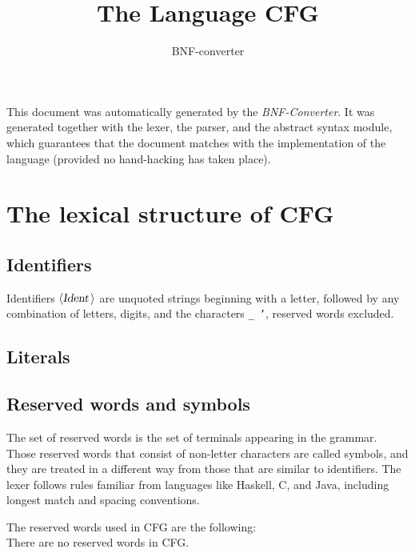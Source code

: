 \documentclass[a4paper,11pt]{article}
\author{BNF-converter}
\title{The Language CFG}
\begin{document}
\maketitle

\newcommand{\emptyP}{\mbox{$\epsilon$}}
\newcommand{\terminal}[1]{\mbox{{\texttt {#1}}}}
\newcommand{\nonterminal}[1]{\mbox{$\langle \mbox{{\sl #1 }} \! \rangle$}}
\newcommand{\arrow}{\mbox{::=}}
\newcommand{\delimit}{\mbox{$|$}}
\newcommand{\reserved}[1]{\mbox{{\texttt {#1}}}}
\newcommand{\literal}[1]{\mbox{{\texttt {#1}}}}
\newcommand{\symb}[1]{\mbox{{\texttt {#1}}}}

This document was automatically generated by the {\em BNF-Converter}. It was generated together with the lexer, the parser, and the abstract syntax module, which guarantees that the document matches with the implementation of the language (provided no hand-hacking has taken place).

\section*{The lexical structure of CFG}
\subsection*{Identifiers}
Identifiers \nonterminal{Ident} are unquoted strings beginning with a letter,
followed by any combination of letters, digits, and the characters {\tt \_ '},
reserved words excluded.


\subsection*{Literals}




\subsection*{Reserved words and symbols}
The set of reserved words is the set of terminals appearing in the grammar. Those reserved words that consist of non-letter characters are called symbols, and they are treated in a different way from those that are similar to identifiers. The lexer follows rules familiar from languages like Haskell, C, and Java, including longest match and spacing conventions.

The reserved words used in CFG are the following: \\

There are no reserved words in CFG.\\
\end{document}
